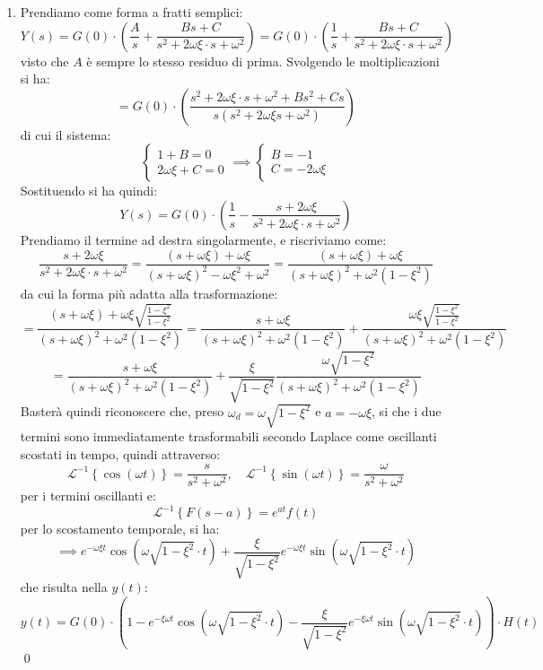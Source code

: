\documentclass[a4paper,11pt]{article}
\begin{document}
\begin{enumerate}
\item Prendiamo come forma a fratti semplici:
	$$
	Y(s) = G(0) \cdot \left( \frac{A}{s} + \frac{Bs + C}{s^2 + 2\omega \xi \cdot s + \omega^2} \right) = G(0) \cdot \left( \frac{1}{s} + \frac{Bs + C}{s^2 + 2\omega \xi \cdot s + \omega^2} \right) 
	$$
	visto che $A$ è sempre lo stesso residuo di prima.
	Svolgendo le moltiplicazioni si ha:
	$$
	 = G(0) \cdot \left( \frac{s^2 + 2 \omega \xi \cdot s + \omega^2 + Bs^2 + Cs}{s (s^2 + 2 \omega \xi s + \omega^2)} \right)
	$$
	di cui il sistema:
	\[
		\begin{cases}
			1 + B = 0 \\ 
			2 \omega \xi + C = 0
		\end{cases} \implies
		\begin{cases}
			B = -1 \\ 
			C = - 2 \omega \xi	
		\end{cases}
	\]
	Sostituendo si ha quindi:
	$$
	Y(s) = G(0) \cdot \left( \frac{1}{s} - \frac{s + 2 \omega \xi}{s^2 + 2 \omega \xi \cdot s + \omega^2} \right)
	$$
	Prendiamo il termine ad destra singolarmente, e riscriviamo come:
	$$
	\frac{s + 2 \omega \xi}{s^2 + 2 \omega \xi \cdot s + \omega^2} = \frac{(s + \omega \xi) + \omega \xi}{(s + \omega \xi)^2 - \omega \xi^2 + \omega^2} = \frac{(s+ \omega \xi) + \omega \xi}{(s + \omega \xi)^2 + \omega^2 (1 - \xi^2)} 
	$$
	da cui la forma più adatta alla trasformazione:
	$$
	= \frac{(s+ \omega \xi) + \omega \xi \sqrt{ \frac{1 - \xi^2}{1 - \xi^2} }}{(s + \omega \xi)^2 + \omega^2 (1 - \xi^2)} = \frac{s + \omega \xi}{(s + \omega \xi)^2 + \omega^2 (1 - \xi^2)} + \frac{ \omega \xi \sqrt{ \frac{1 - \xi^2}{1 - \xi^2} } }{(s + \omega \xi)^2 + \omega^2 (1 - \xi^2)}
	$$
	$$
	= \frac{s + \omega \xi}{(s + \omega \xi)^2 + \omega^2 (1 - \xi^2)} + \frac{\xi}{\sqrt{1 - \xi^2}} \frac{ \omega \sqrt{ 1 - \xi^2 } }{(s + \omega \xi)^2 + \omega^2 (1 - \xi^2)}
	$$
	Basterà quindi riconoscere che, preso $\omega_d = \omega \sqrt{1 - \xi^2}$ e $a = -\omega \xi$, si che i due termini sono immediatamente trasformabili secondo Laplace come oscillanti scostati in tempo, quindi attraverso:
	$$
	\mathcal{L}^{-1} \left\{ \cos(\omega t) \right\} = \frac{s}{s^2 + \omega^2}, \quad \mathcal{L}^{-1} \left\{ \sin(\omega t) \right\} = \frac{\omega}{s^2 + \omega^2}
	$$
	per i termini oscillanti e:
	$$
	\mathcal{L}^{-1} \left\{ F(s - a) \right\} = e^{at} f(t)
	$$
	per lo scostamento temporale, si ha:
	$$
	\implies e^{-\omega \xi t} \cos\left(\omega \sqrt{ 1- \xi^2} \cdot t\right) + \frac{\xi}{\sqrt{1 - \xi^2}} e^{-\omega \xi t} \sin\left(\omega \sqrt{1 - \xi^2} \cdot t\right)
	$$
	che risulta nella $y(t)$:
	$$
y(t) = G(0) \cdot \left( 1 - e^{-\xi \omega t} \cos\left(\omega \sqrt{1 - \xi ^2} \cdot t \right) - \frac{\xi}{\sqrt{1 - \xi^2}} e^{-\xi \omega t} \sin\left( \omega \sqrt{1 - \xi^2} \cdot t \right) \right) \cdot H(t)
	$$ \qed
\end{enumerate}
\end{document}
